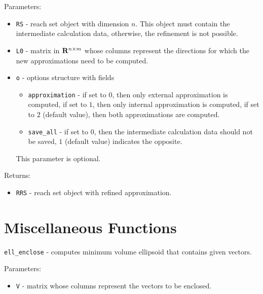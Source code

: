Parameters:
\begin{itemize}
\item {\tt RS} - reach set object with dimension $n$. This object must
contain the intermediate calculation data, otherwise, the refinement
is not possible.
\item {\tt L0} - matrix in ${\bf R}^{n\times m}$ whose columns represent the
directions for which the new approximations need to be computed.
\item {\tt o} - options structure with fields
\begin{itemize}
\item {\tt approximation} - if set to $0$, then only external approximation
is computed, if set to $1$, then only internal approximation is computed,
if set to $2$ (default value), then both approximations are computed.
\item {\tt save\_all} - if set to $0$, then the intermediate calculation
data should not be saved, $1$ (default value) indicates the opposite.
\end{itemize}
This parameter is optional.
\end{itemize}

Returns:
\begin{itemize}
\item {\tt RRS} - reach set object with refined approximation.
\end{itemize}
















\newpage





















\section{Miscellaneous Functions}
{\Large {\tt ell\_enclose}} - computes minimum volume ellipsoid that
contains given vectors.

Parameters:
\begin{itemize}
\item {\tt V} - matrix whose columns represent the vectors to be enclosed.
\end{itemize}

